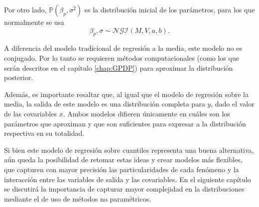 Por otro lado, $\mathbb{P}(\beta_p,\sigma^2)$ es la distribuci\'on inicial de los par\'ametros, para los que normalmente se usa
\begin{equation*}
    \beta_p,\sigma \sim \mathcal{NGI}(M,V,a,b). 
\end{equation*}

A diferencia del modelo tradicional de regresi\'on a la media, este modelo no es conjugado. Por lo tanto se requieren m\'etodos computacionales (como los que ser\'an descritos en el cap\'itulo \ref{chap:GPDP}) para aproximar la distribuci\'on posterior.

Adem\'as, es importante resaltar que, al igual que el modelo de regresi\'on sobre la media, la salida de este modelo es una distribuci\'on completa para $y$, dado el valor de las covariables $x$. Ambos modelos difieren \'unicamente en cu\'ales son los par\'ametros que aproximan y que son suficientes para expresar a la distribuci\'on respectiva en su totalidad.

Si bien este modelo de regresi\'on sobre cuantiles representa una buena alternativa, a\'un queda la posibilidad de retomar estas ideas y crear modelos m\'as flexibles, que capturen con mayor precisi\'on las particularidades de cada fen\'omeno y la interacci\'on entre las variables de salida y las covariables. En el siguiente cap\'itulo se discutir\'a la importancia de capturar mayor complejidad en la distribuciones mediante el de uso de m\'etodos no param\'etricos.